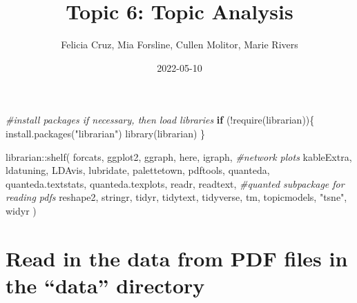 \documentclass[
]{article}
\title{Topic 6: Topic Analysis}
\author{Felicia Cruz, Mia Forsline, Cullen Molitor, Marie Rivers}
\date{2022-05-10}
\newenvironment{Shaded}{\begin{snugshade}}{\end{snugshade}}
\newcommand{\AttributeTok}[1]{\textcolor[rgb]{0.77,0.63,0.00}{#1}}
\newcommand{\CommentTok}[1]{\textcolor[rgb]{0.56,0.35,0.01}{\textit{#1}}}
\newcommand{\ConstantTok}[1]{\textcolor[rgb]{0.00,0.00,0.00}{#1}}
\newcommand{\ControlFlowTok}[1]{\textcolor[rgb]{0.13,0.29,0.53}{\textbf{#1}}}
\newcommand{\FunctionTok}[1]{\textcolor[rgb]{0.00,0.00,0.00}{#1}}
\newcommand{\NormalTok}[1]{#1}
\newcommand{\OtherTok}[1]{\textcolor[rgb]{0.56,0.35,0.01}{#1}}
\newcommand{\SpecialCharTok}[1]{\textcolor[rgb]{0.00,0.00,0.00}{#1}}
\newcommand{\StringTok}[1]{\textcolor[rgb]{0.31,0.60,0.02}{#1}}
\begin{document}
\maketitle

\begin{Shaded}
\begin{Highlighting}[]
\CommentTok{\#install packages if necessary, then load libraries}
\ControlFlowTok{if}\NormalTok{ (}\SpecialCharTok{!}\FunctionTok{require}\NormalTok{(librarian))\{}
  \FunctionTok{install.packages}\NormalTok{(}\StringTok{"librarian"}\NormalTok{)}
  \FunctionTok{library}\NormalTok{(librarian)}
\NormalTok{\}}

\NormalTok{librarian}\SpecialCharTok{::}\FunctionTok{shelf}\NormalTok{(}
\NormalTok{  forcats, }
\NormalTok{  ggplot2,}
\NormalTok{  ggraph,}
\NormalTok{  here,}
\NormalTok{  igraph, }\CommentTok{\#network plots}
\NormalTok{  kableExtra,}
\NormalTok{  ldatuning,}
\NormalTok{  LDAvis,}
\NormalTok{  lubridate,}
\NormalTok{  palettetown,}
\NormalTok{  pdftools,}
\NormalTok{  quanteda,}
\NormalTok{  quanteda.textstats,}
\NormalTok{  quanteda.texplots,}
\NormalTok{  readr,}
\NormalTok{  readtext, }\CommentTok{\#quanted subpackage for reading pdfs}
\NormalTok{  reshape2,}
\NormalTok{  stringr,}
\NormalTok{  tidyr,}
\NormalTok{  tidytext,}
\NormalTok{  tidyverse,}
\NormalTok{  tm,}
\NormalTok{  topicmodels,}
  \StringTok{"tsne"}\NormalTok{,}
\NormalTok{  widyr}
\NormalTok{  )}
\end{Highlighting}
\end{Shaded}

\hypertarget{read-in-the-data-from-pdf-files-in-the-data-directory}{%
\section{Read in the data from PDF files in the ``data''
directory}\label{read-in-the-data-from-pdf-files-in-the-data-directory}}

\begin{Shaded}
\end{Shaded}
\end{document}
